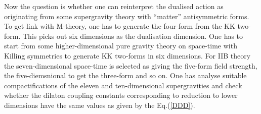 \documentclass[a4paper,12pt]{article}
\begin{document}
Now the question is whether one can reinterpret the dualised
action as originating from some supergravity theory with
``matter'' antisymmetric forms. To get link with M-theory, one
has to generate the four-form from the KK two-form. This picks
out six dimensions as the dualisation dimension. One has to
start from some higher-dimensional pure gravity theory on
space-time with Killing symmetries to generate KK two-forms in
six dimensions. For IIB theory the seven-dimensional space-time
is selected as giving the five-form field strength, the
five-diemsnional to get the three-form and so on. One has
analyse suitable compactifications of the eleven and
ten-dimensional supergravities and check whether the dilaton
coupling constants corresponding to reduction to lower
dimensions have the same values as given by the Eq.(\ref{DDD}).


\end{document}
